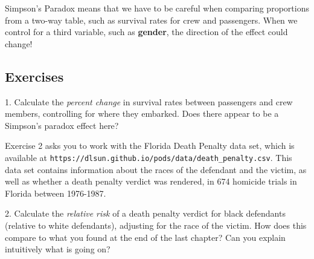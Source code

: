 Simpson's Paradox means that we have to be careful when comparing proportions from a two-way table, such as survival rates for crew and passengers. When we control for a third variable, such as \textbf{gender}, the direction of the effect could change!



\subsection{Exercises}\label{2.3.4}



1. Calculate the \textit{percent change} in survival rates between passengers and crew members, controlling for where they embarked. Does there appear to be a Simpson's paradox effect here?



Exercise 2 asks you to work with the Florida Death Penalty data set, which is available at  \verb|https://dlsun.github.io/pods/data/death_penalty.csv|. This data set contains information about the races of the defendant and the victim, as well as whether a death penalty verdict was rendered, in 674 homicide trials in Florida between 1976-1987.



2. Calculate the \textit{relative risk} of a death penalty verdict for black defendants (relative to white defendants), adjusting for the race of the victim. How does this compare to what you found at the end of the last chapter? Can you explain intuitively what is going on?



